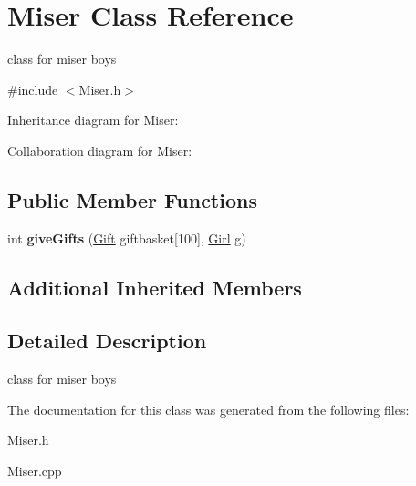 \hypertarget{classMiser}{}\section{Miser Class Reference}
\label{classMiser}


class for miser boys  




{\ttfamily \#include $<$Miser.\+h$>$}



Inheritance diagram for Miser\+:


Collaboration diagram for Miser\+:
\subsection*{Public Member Functions}
\begin{DoxyCompactItemize}
\item 
int {\bfseries give\+Gifts} (\hyperlink{classGift}{Gift} giftbasket\mbox{[}100\mbox{]}, \hyperlink{classGirl}{Girl} g)\hypertarget{classMiser_a4b930773bd62f5e75f3c8308e680e716}{}\label{classMiser_a4b930773bd62f5e75f3c8308e680e716}

\end{DoxyCompactItemize}
\subsection*{Additional Inherited Members}


\subsection{Detailed Description}
class for miser boys 

The documentation for this class was generated from the following files\+:\begin{DoxyCompactItemize}
\item 
Miser.\+h\item 
Miser.\+cpp\end{DoxyCompactItemize}
